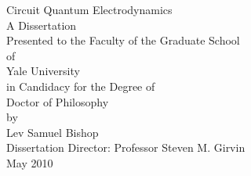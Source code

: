 %

\thispagestyle{empty}
\begin{singlespace}
\vspace*{1cm}
\begin{center}
{\Large Circuit Quantum Electrodynamics} \\

\vfill
    A Dissertation\\
    Presented to the Faculty of the Graduate School\\
    of\\
    Yale University\\
    in Candidacy for the Degree of\\
    Doctor of Philosophy\\
\vfill
    by\\
    Lev Samuel Bishop\\
\vspace{1cm}
    Dissertation Director: Professor Steven M. Girvin\\
\vspace{1cm}
    May 2010\\
\end{center}
\end{singlespace}

